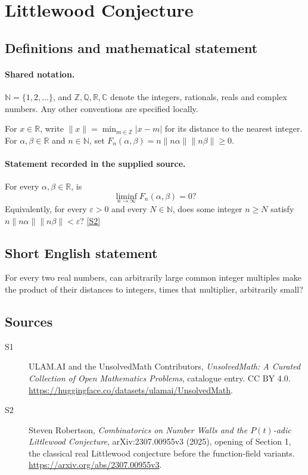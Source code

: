 \documentclass[11pt]{article}
\newcommand{\sref}[2]{\hyperlink{source:#1:#2}{[S#2]}}
\begin{document}
\section{Littlewood Conjecture}\label{statement}

\subsection{Definitions and mathematical statement}

\paragraph{Shared notation.}$\mathbb N=\{1,2,\ldots\}$, and $\mathbb Z,\mathbb Q,\mathbb R,\mathbb C$ denote the integers, rationals, reals and complex numbers. Any other conventions are specified locally.


For \(x\in\mathbb R\), write
\(\|x\|=\min_{m\in\mathbb Z}|x-m|\) for its distance to
the nearest integer. For \(\alpha,\beta\in\mathbb R\) and
\(n\in\mathbb N\), set
\(F_n(\alpha,\beta)=n\|n\alpha\|\|n\beta\|\ge0\).
\paragraph{Statement recorded in the supplied source.}
For every \(\alpha,\beta\in\mathbb R\), is
\[
                      \liminf_{n\to\infty}F_n(\alpha,\beta)=0?
\]
Equivalently, for every \(\varepsilon>0\) and every \(N\in\mathbb N\),
does some integer \(n\ge N\) satisfy
\(n\|n\alpha\|\|n\beta\|<\varepsilon\)? \sref{statement}{2}
\subsection{Short English statement}
For every two real numbers, can arbitrarily large common integer multiples make the product of their distances to integers, times that multiplier, arbitrarily small?
\subsection{Sources}
\begin{description}
\item[\hypertarget{source:statement:1}{S1}] ULAM.AI and the UnsolvedMath Contributors, \emph{UnsolvedMath: A Curated Collection of Open Mathematics Problems}, catalogue entry. CC BY 4.0. \url{https://huggingface.co/datasets/ulamai/UnsolvedMath}.
\item[\hypertarget{source:statement:2}{S2}] Steven Robertson, \emph{Combinatorics on Number Walls and the $P(t)$-adic Littlewood Conjecture}, arXiv:2307.00955v3 (2025), opening of Section 1, the classical real Littlewood conjecture before the function-field variants. \url{https://arxiv.org/abs/2307.00955v3}.
\end{description}
\label{end:statement}
\end{document}
